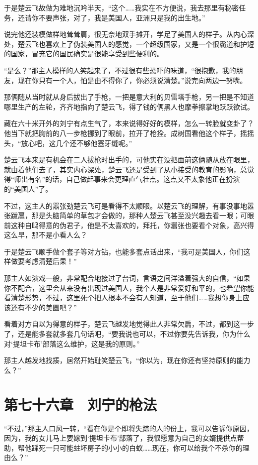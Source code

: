 于是楚云飞故做为难地沉吟半天，“这个……我实在不方便说，我去那里有秘密任务，还请你不要声张，对了，我是美国人，亚洲只是我的出生地。”

说完他还装模做样地耸耸肩，很无奈地双手摊开，学足了美国人的样子。从内心深处，楚云飞也喜欢上了伪装美国人的感觉，一个超级国家，又是一个很霸道和护短的国家，冒充它的国民确实是很能享受到些便利的。

“是么？”那主人模样的人笑起来了，不过很有些恐吓的味道，“很抱歉，我的朋友，现在你只有一个人，怕是由不得你了，你必须说清楚。”说完向两边一努嘴。

那俩随从当时就从身后拔出了手枪，一把是意大利的贝雷塔手枪，另一把是不知道哪里生产的左轮，齐齐地指向了楚云飞，得了钱的俩黑人也摩拳擦掌地跃跃欲试。

藏在六十米开外的刘宁有点生气了，本来说得好好的模样，怎么一转脸就变卦了？他当下就把胸前的八一步枪挪到了眼前，拉开了枪拴。成树国看他这个样子，摇摇头，“放心吧，这几个还不够他塞牙缝呢。”

楚云飞本来是有机会在二人拔枪时出手的，可他实在没把面前这俩随从放在眼里，就由着他们去了，其实内心深处，楚云飞还是受到了从小接受的教育的影响，总觉得“师出有名”的话，自己做起事来会更理直气壮点。这点又不太象他正在扮演的“美国人”了。

不过，这主人的嚣张劲楚云飞可是看得不太顺眼。以楚云飞的理解，有事没事地嚣张跋扈，那是头脑简单的草包才会做的，那种人楚云飞甚至没兴趣去看一眼；可眼前这种自鸣得意的伪君子，他是不太喜欢的，拜托，你嚣张也要看个对象，高兴得这么早，那不是小看人么？

于是楚云飞顺手做个套子等对方钻，也能多套点话出来，“我可是美国人，你们这样做要考虑清楚后果！”

那主人如演戏一般，非常配合地接过了台词，言语之间洋溢着强大的自信，“如果你不配合，这里会从来没有出现过美国人，我个人是非常爱好和平的，也希望你能看清楚形势，不过，这里死个把人根本不会有人知道，至于他们……我想你身上应该还有不少的美圆吧？”

看着对方自以为得意的样子，楚云飞越发地觉得此人非常欠扁，不过，都到这一步了，还是能多套就多套几句话吧，“要我说也可以，不过你要先告诉我，你为什么对‘提坦卡布’部落这么维护，这是我的原则。”

那主人越发地找揍，居然开始耻笑楚云飞，“你以为，现在你还有坚持原则的能力么？”

\section{第七十六章　刘宁的枪法}

“不过，”那主人口风一转，“看在你是个即将失踪的人的份上，我可以告诉你原因，因为，我的女儿马上要嫁到‘提坦卡布’部落了，我很愿意为自己的女婿提供点帮助，帮他踩死一只可能蛀坏房子的小小的白蚁……现在，你可以给我个不杀你的理由么？”

